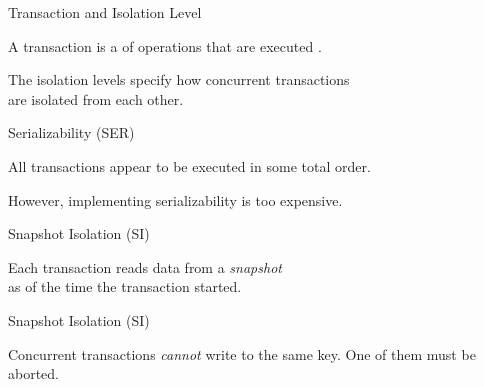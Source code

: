 
\begin{frame}{Transaction and Isolation Level}
  \begin{center}
    A transaction is a  of operations
    that are executed .

    \vspace{0.30cm}
		\resizebox{0.55\textwidth}{!}{}

    \vspace{0.20cm}
    The isolation levels specify how concurrent transactions \\[2pt]
    are isolated from each other.
  \end{center}
\end{frame}

\begin{frame}{Serializability (SER)}
  \begin{center}
    All transactions appear to be executed in some total order.

    \vspace{0.30cm}
		\resizebox{0.50\textwidth}{!}{}

    \vspace{0.20cm}
    However, implementing serializability is too expensive.
  \end{center}
\end{frame}

\begin{frame}{Snapshot Isolation (SI)}
  \begin{center}
		\resizebox{0.50\textwidth}{!}{}

    \vspace{0.20cm}
     Each transaction reads data from a {\it snapshot} \\
      as of the time the transaction started.
  \end{center}
\end{frame}

\begin{frame}{Snapshot Isolation (SI)}
  \begin{center}
    \resizebox{0.48\textwidth}{!}{}
  \end{center}

  \vspace{-0.50cm}
    Concurrent transactions {\it cannot} write to the same key.
    One of them must be aborted.
\end{frame}
